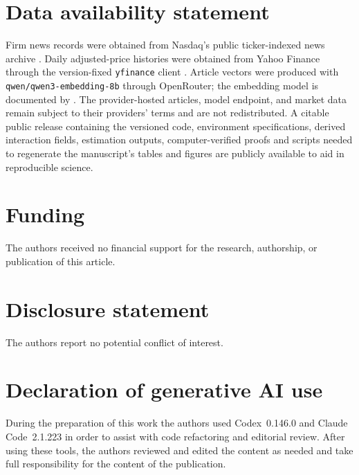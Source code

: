 \section*{Data availability statement}

Firm news records were obtained from Nasdaq's public ticker-indexed news
archive \citep{nasdaq_news_headlines_2026}.
Daily adjusted-price histories were obtained from Yahoo Finance
\citep{yahoo_finance_historical_2026} through the version-fixed
\texttt{yfinance} client \citep{aroussi_yfinance_2026}.
Article vectors were produced with \texttt{qwen/qwen3-embedding-8b} through
OpenRouter; the embedding model is documented by
\citet{qwen3_embedding_2025}.
The provider-hosted articles, model endpoint, and market data remain subject to
their providers' terms and are not redistributed.
A citable public release containing the versioned code, environment
specifications, derived interaction fields, estimation outputs,
computer-verified proofs and scripts needed to regenerate the manuscript's
tables and figures are publicly available to aid in reproducible science.

\section*{Funding}

The authors received no financial support for the research, authorship, or
publication of this article.

\section*{Disclosure statement}

The authors report no potential conflict of interest.

\section*{Declaration of generative AI use}

During the preparation of this work the authors used Codex~0.146.0 and
Claude Code~2.1.223 in order to assist with code refactoring and editorial
review.
After using these tools, the authors reviewed and edited the content as needed
and take full responsibility for the content of the publication.
